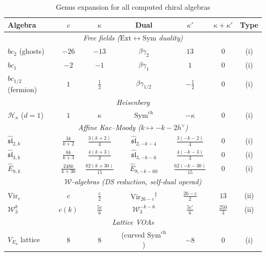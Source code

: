\begin{table}[ht]
\centering
\caption{Genus expansion for all computed chiral algebras}
\label{tab:genus-expansion-master}
\renewcommand{\arraystretch}{1.5}
{\small
\begin{tabular}{|l|c|c|c|c|c|c|}
\hline
\textbf{Algebra} & $c$ & $\kappa$ &
\textbf{Dual} & $\kappa'$ & $\kappa{+}\kappa'$ &
\textbf{Type} \\
\hline
\multicolumn{7}{|c|}{\textit{Free fields
 ($\mathrm{Ext} \leftrightarrow \mathrm{Sym}$ duality)}} \\
\hline
$bc_2$ (ghosts)
 & $-26$ & $-13$ & $\beta\gamma_2$
 & $13$ & $0$ & (i) \\
\hline
$bc_1$
 & $-2$ & $-1$ & $\beta\gamma_1$
 & $1$ & $0$ & (i) \\
\hline
$bc_{1/2}$ (fermion)
 & $1$ & $\frac{1}{2}$ & $\beta\gamma_{1/2}$
 & $-\frac{1}{2}$ & $0$ & (i) \\
\hline
\multicolumn{7}{|c|}{\textit{Heisenberg}} \\
\hline
$\mathcal{H}_\kappa$ ($d = 1$)
 & $1$ & $\kappa$ & $\mathrm{Sym}^{\mathrm{ch}}$
 & $-\kappa$ & $0$ & (i) \\
\hline
\multicolumn{7}{|c|}{\textit{Affine Kac--Moody
 ($k \mapsto -k - 2h^\vee$)}} \\
\hline
$\widehat{\mathfrak{sl}}_{2,k}$
 & $\frac{3k}{k{+}2}$ & $\frac{3(k{+}2)}{4}$
 & $\widehat{\mathfrak{sl}}_{2,-k-4}$
 & $\frac{3(-k{-}2)}{4}$ & $0$ & (i) \\
\hline
$\widehat{\mathfrak{sl}}_{3,k}$
 & $\frac{8k}{k{+}3}$ & $\frac{4(k{+}3)}{3}$
 & $\widehat{\mathfrak{sl}}_{3,-k-6}$
 & $\frac{4(-k{-}3)}{3}$ & $0$ & (i) \\
\hline
$\widehat{E}_{8,k}$
 & $\frac{248k}{k{+}30}$ & $\frac{62(k{+}30)}{15}$
 & $\widehat{E}_{8,-k-60}$
 & $\frac{62(-k{-}30)}{15}$ & $0$ & (i) \\
\hline
\multicolumn{7}{|c|}{\textit{$\mathcal{W}$-algebras (DS
 reduction, self-dual operad)}} \\
\hline
$\mathrm{Vir}_c$
 & $c$ & $\frac{c}{2}$
 & $\mathrm{Vir}_{26-c}$\textsuperscript{$\dagger$}
 & $\frac{26-c}{2}$ & $13$ & (ii) \\
\hline
$\mathcal{W}_3^k$
 & $c(k)$ & $\frac{5c}{6}$
 & $\mathcal{W}_3^{-k-6}$
 & $\frac{5c'}{6}$ & $\frac{250}{3}$ & (ii) \\
\hline
\multicolumn{7}{|c|}{\textit{Lattice VOAs}} \\
\hline
$V_{E_8}$ lattice
 & $8$ & $8$
 & (curved $\mathrm{Sym}^{\mathrm{ch}}$)
 & $-8$ & $0$ & (i) \\
\hline
\end{tabular}
}
\end{table}
